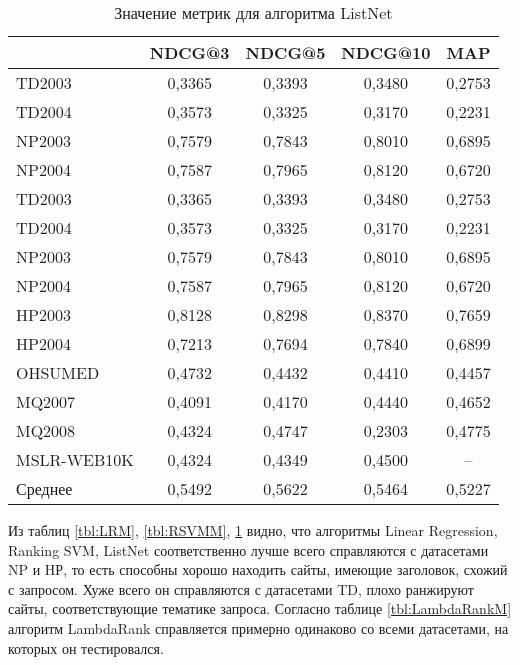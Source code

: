 \begin{table}[!ht]
	\begin{center}
		\begin{threeparttable}
			\captionsetup{justification=raggedright,singlelinecheck=off}
			\caption{Значение метрик для алгоритма ListNet}
			\label{tbl:ListNetM}
			\begin{tabular}{|p{110pt}|c|c|c|c|}
				\hline
				\makecell[c]{Датасет}  & NDCG@3 & NDCG@5 & NDCG@10 & MAP \\\hline
				TD2003&	0,3365&	0,3393&	0,3480&	0,2753\\\hline
				TD2004&	0,3573&	0,3325&	0,3170&	0,2231\\\hline
				NP2003&	0,7579&	0,7843&	0,8010&	0,6895\\\hline
				NP2004&	0,7587&	0,7965&	0,8120&	0,6720\\\hline
				TD2003&	0,3365&	0,3393&	0,3480&	0,2753\\\hline
				TD2004&	0,3573&	0,3325&	0,3170&	0,2231\\\hline
				NP2003&	0,7579&	0,7843&	0,8010&	0,6895\\\hline
				NP2004&	0,7587&	0,7965&	0,8120&	0,6720\\\hline
				HP2003&	0,8128&	0,8298&	0,8370&	0,7659\\\hline
				HP2004&	0,7213&	0,7694&	0,7840&	0,6899\\\hline
				OHSUMED&0,4732&	0,4432&	0,4410&	0,4457\\\hline
				MQ2007&	0,4091&	0,4170&	0,4440&	0,4652\\\hline
				MQ2008&	0,4324&	0,4747&	0,2303&	0,4775\\\hline
				MSLR-WEB10K&0,4324&	0,4349&	0,4500&	--\\\hline
				Среднее& 0,5492	&0,5622	&0,5464	&0,5227\\\hline
			\end{tabular}
		\end{threeparttable}
	\end{center}
\end{table}


Из таблиц \ref{tbl:LRM}, \ref{tbl:RSVMM}, \ref{tbl:ListNetM} видно, что алгоритмы Linear Regression, Ranking SVM, ListNet соответственно лучше всего справляются с датасетами NP и HР, то есть способны хорошо находить сайты, имеющие заголовок, схожий с запросом. Хуже всего он справляются с датасетами TD, плохо ранжируют сайты, соответствующие тематике запроса. Согласно таблице \ref{tbl:LambdaRankM} алгоритм LambdaRank справляется примерно одинаково со всеми датасетами, на которых он тестировался.

